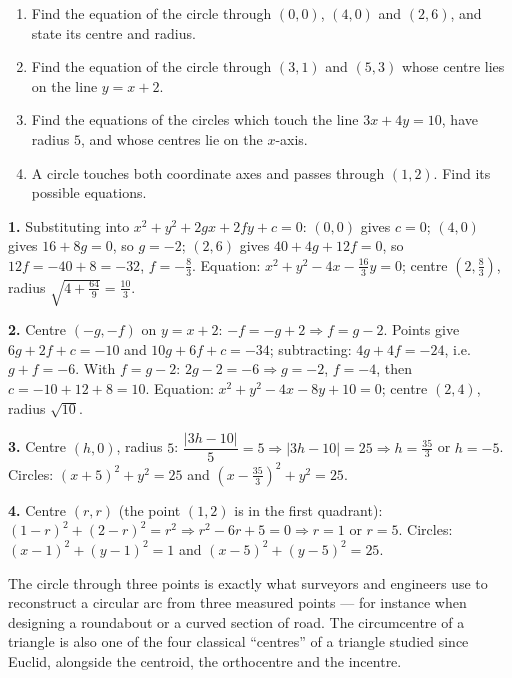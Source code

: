 \documentclass[11pt]{article}
\begin{document}
\begin{exercice}[Consolidation]
\begin{enumerate}
\item Find the equation of the circle through $(0,0)$, $(4,0)$ and $(2,6)$, and state its centre and radius.
\item Find the equation of the circle through $(3,1)$ and $(5,3)$ whose centre lies on the line $y=x+2$.
\item Find the equations of the circles which touch the line $3x+4y=10$, have radius $5$, and whose centres lie on the $x$-axis.
\item A circle touches both coordinate axes and passes through $(1,2)$. Find its possible equations.
\end{enumerate}
\end{exercice}

\begin{corrige}
\textbf{1.} Substituting into $x^{2}+y^{2}+2gx+2fy+c=0$: $(0,0)$ gives $c=0$; $(4,0)$ gives $16+8g=0$, so $g=-2$; $(2,6)$ gives $40+4g+12f=0$, so $12f=-40+8=-32$, $f=-\tfrac{8}{3}$. Equation: $x^{2}+y^{2}-4x-\tfrac{16}{3}y=0$; centre $\left(2,\tfrac{8}{3}\right)$, radius $\sqrt{4+\tfrac{64}{9}}=\tfrac{10}{3}$.

\textbf{2.} Centre $(-g,-f)$ on $y=x+2$: $-f=-g+2 \Rightarrow f=g-2$. Points give $6g+2f+c=-10$ and $10g+6f+c=-34$; subtracting: $4g+4f=-24$, i.e.\ $g+f=-6$. With $f=g-2$: $2g-2=-6 \Rightarrow g=-2$, $f=-4$, then $c=-10+12+8=10$. Equation: $x^{2}+y^{2}-4x-8y+10=0$; centre $(2,4)$, radius $\sqrt{10}$.

\textbf{3.} Centre $(h,0)$, radius $5$: $\dfrac{|3h-10|}{5}=5 \Rightarrow |3h-10|=25 \Rightarrow h=\tfrac{35}{3}$ or $h=-5$. Circles: $(x+5)^{2}+y^{2}=25$ and $\left(x-\tfrac{35}{3}\right)^{2}+y^{2}=25$.

\textbf{4.} Centre $(r,r)$ (the point $(1,2)$ is in the first quadrant): $(1-r)^{2}+(2-r)^{2}=r^{2} \Rightarrow r^{2}-6r+5=0 \Rightarrow r=1$ or $r=5$. Circles: $(x-1)^{2}+(y-1)^{2}=1$ and $(x-5)^{2}+(y-5)^{2}=25$.
\end{corrige}

\begin{savaistu}
The circle through three points is exactly what surveyors and engineers use to reconstruct a circular arc from three measured points --- for instance when designing a roundabout or a curved section of road. The circumcentre of a triangle is also one of the four classical ``centres'' of a triangle studied since Euclid, alongside the centroid, the orthocentre and the incentre.
\end{savaistu}
\end{document}
